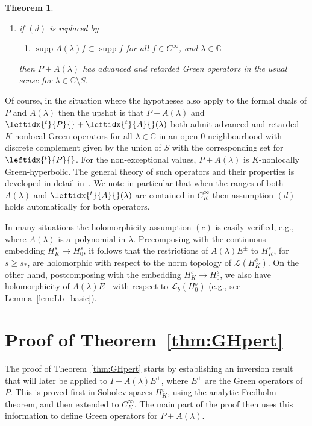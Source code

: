 \documentclass[11pt]{article}
\numberwithin{equation}{section}
\numberwithin{equation}{section}
\newtheorem{Theorem}{Theorem}[section]
\newcommand{\CC}{{\mathbb C}}
\newcommand{\LL}{{\mathcal L}}
\DeclareMathOperator{\supp}{supp}
\newcommand{\adj}[1]{\leftidx{^{t}}{#1}{}}
\begin{document}
\begin{Theorem}
\begin{enumerate}
 		\item[$(E)$]%
 if $(d)$ is replaced by
 		\begin{enumerate}
 			\item[$(d')$] $\supp A(\lambda)f\subset \supp f$ for all $f\in C^\infty$, and $\lambda\in\CC$
 		\end{enumerate}
 		then $P+ A(\lambda)$ has advanced and retarded Green operators in the usual sense
 		for $\lambda\in\CC\setminus S$.
 	\end{enumerate}
 \end{Theorem}
 Of course, in the situation where the hypotheses also apply to the formal duals of $P$ and $A(\lambda)$ then the upshot is that $P+ A(\lambda)$ and $\adj{P}+\adj{A}(\lambda)$
 both admit advanced and retarded $K$-nonlocal Green operators for all
 $\lambda\in\CC$ in an open $0$-neighbourhood with discrete complement given by the union of $S$ with the corresponding set for $\adj{P}$. For the non-exceptional values, $P+A(\lambda)$ is $K$-nonlocally Green-hyperbolic. The general theory of such operators and their properties is developed in detail in~\cite{FewVer:20xx}. We note in particular that when
 the ranges of both $A(\lambda)$ and $\adj{A}(\lambda)$ are contained in $C^\infty_K$ then assumption $(d)$ holds automatically for both operators.

 In many situations the holomorphicity assumption $(c)$ is easily verified, e.g., where $A(\lambda)$ is a~polynomial in $\lambda$. Precomposing with the continuous embedding $H^s_K\to H^s_0$, it follows that the restrictions of $A(\lambda)E^\pm$ to $H^s_K$, for $s\ge s_*$, are holomorphic with respect to the norm topology
 of $\LL(H^s_K)$. On the other hand, postcomposing with the embedding $H^s_K\to H^s_0$, we also have holomorphicity of $A(\lambda)E^\pm$ with respect to
 $\LL_b(H^s_0)$ (e.g., see Lemma~\ref{lem:Lb_basic}).

\setcounter{section}{4}
 \section{Proof of Theorem~\ref{thm:GHpert}}\label{sec:proof}

 The proof of Theorem~\ref{thm:GHpert} starts by establishing an inversion result that will later be applied to $I+A(\lambda)E^\pm$, where $E^\pm$ are the Green operators of $P$. This is proved first in Sobolev spaces $H^s_K$, using the analytic Fredholm theorem, and then extended to $C^\infty_K$. The main part of the proof then uses this information to define Green operators for $P+ A(\lambda)$.
\end{document}
